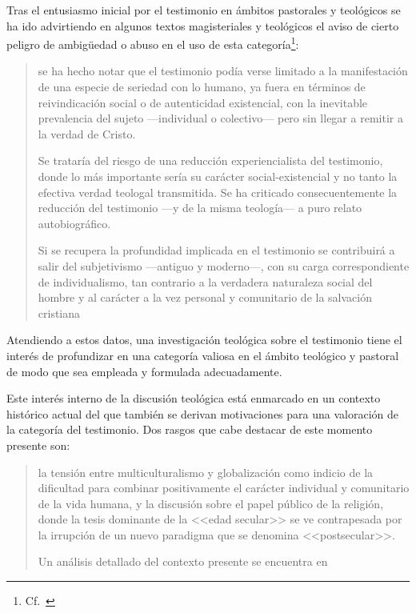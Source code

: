 Tras el entusiasmo inicial por el testimonio en ámbitos pastorales y teológicos se ha ido advirtiendo en algunos textos magisteriales y teológicos el aviso de cierto peligro de ambigüedad o abuso en el uso de esta categoría\footnote{Cf.~\cite[83]{prades2015testimonio}}: \blockquote[{\cite[84]{prades2015testimonio}}]{se ha hecho notar que el testimonio podía verse limitado a la manifestación de una especie de seriedad con lo humano, ya fuera en términos de reivindicación social o de autenticidad existencial, con la inevitable prevalencia del sujeto ---individual o colectivo--- pero sin llegar a remitir a la verdad de Cristo. \textelp{}

Se trataría del riesgo de una reducción experiencialista del testimonio, donde lo más importante sería su carácter social-existencial y no tanto la efectiva verdad teologal transmitida. Se ha criticado consecuentemente la reducción del testimonio ---y de la misma teología--- a puro relato autobiográfico.

Si se recupera la profundidad implicada en el testimonio se contribuirá a salir del subjetivismo ---antiguo y moderno---, con su carga correspondiente de individualismo, tan contrario a la verdadera naturaleza social del hombre y al carácter a la vez personal y comunitario de la salvación cristiana}. Atendiendo a estos datos, una investigación teológica sobre el testimonio tiene el interés de profundizar en una categoría valiosa en el ámbito teológico y pastoral de modo que sea empleada y formulada adecuadamente.

Este interés interno de la discusión teológica está enmarcado en un contexto histórico actual del que también se derivan motivaciones para una valoración de la categoría del testimonio. Dos rasgos que cabe destacar de este momento presente son: \blockquote[{\cite[75]{prades2015testimonio}} Un análisis detallado del contexto presente se encuentra en {\cite[3-77]{prades2015testimonio}}]{la tensión entre multiculturalismo y globalización como indicio de la dificultad para combinar positivamente el carácter individual y comunitario de la vida humana, y la discusión sobre el papel público de la religión, donde la tesis dominante de la <<edad secular>> se ve contrapesada por la irrupción de un nuevo paradigma que se denomina <<postsecular>>.}

